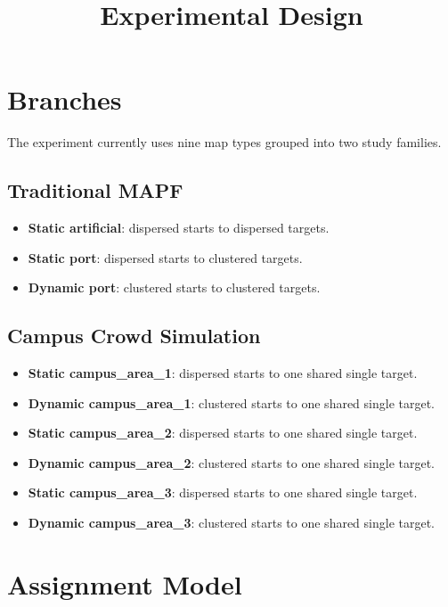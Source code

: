 \documentclass[11pt]{article}
\title{Experimental Design}
\author{}
\date{}
\begin{document}
\maketitle

\section{Branches}

The experiment currently uses nine map types grouped into two study families.

\subsection{Traditional MAPF}
\begin{itemize}[leftmargin=2em]
    \item \textbf{Static artificial}: dispersed starts to dispersed targets.
    \item \textbf{Static port}: dispersed starts to clustered targets.
    \item \textbf{Dynamic port}: clustered starts to clustered targets.
\end{itemize}

\subsection{Campus Crowd Simulation}
\begin{itemize}[leftmargin=2em]
    \item \textbf{Static campus\_area\_1}: dispersed starts to one shared single target.
    \item \textbf{Dynamic campus\_area\_1}: clustered starts to one shared single target.
    \item \textbf{Static campus\_area\_2}: dispersed starts to one shared single target.
    \item \textbf{Dynamic campus\_area\_2}: clustered starts to one shared single target.
    \item \textbf{Static campus\_area\_3}: dispersed starts to one shared single target.
    \item \textbf{Dynamic campus\_area\_3}: clustered starts to one shared single target.
\end{itemize}

\section{Assignment Model}
\end{document}
